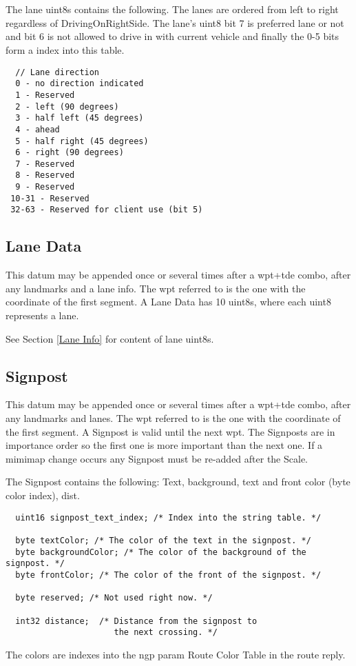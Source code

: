 \documentclass[a4paper]{article}
\begin{document}
\ \\
\ \\
The lane uint8s contains the following. 
The lanes are ordered from left to right regardless of DrivingOnRightSide.
The lane's uint8 bit 7 is preferred lane or not and bit 6 is not allowed to
drive in with current vehicle and finally the 0-5 bits form a index into this
table.

\begin{verbatim}
  // Lane direction
  0 - no direction indicated
  1 - Reserved
  2 - left (90 degrees)
  3 - half left (45 degrees)
  4 - ahead  
  5 - half right (45 degrees)
  6 - right (90 degrees)
  7 - Reserved
  8 - Reserved
  9 - Reserved
 10-31 - Reserved
 32-63 - Reserved for client use (bit 5)
\end{verbatim}

\subsection{Lane Data}
\label{Lane Data}

This datum may be appended once or several times after a 
wpt+tde combo, after any landmarks and a lane info. The wpt referred to 
is the one with the coordinate of the first segment.
A Lane Data has 10 uint8s, where each uint8 represents a lane.

See Section \ref{Lane Info} for content of lane uint8s.


\subsection{Signpost}
\label{Signpost}

This datum may be appended once or several times after a 
wpt+tde combo, after any landmarks and lanes. The wpt referred to is the one 
with the coordinate of the first segment.
A Signpost is valid until the next wpt. The Signposts are in importance order
so the first one is more important than the next one.
If a mimimap change occurs any Signpost must be re-added after the
Scale.

The Signpost contains the following: Text, background, text and front
color (byte color index), dist. 

\begin{verbatim}
  uint16 signpost_text_index; /* Index into the string table. */

  byte textColor; /* The color of the text in the signpost. */
  byte backgroundColor; /* The color of the background of the signpost. */
  byte frontColor; /* The color of the front of the signpost. */

  byte reserved; /* Not used right now. */

  int32 distance;  /* Distance from the signpost to 
                      the next crossing. */
\end{verbatim}

The colors are indexes into the ngp param Route Color Table in the 
route reply.
\end{document}

